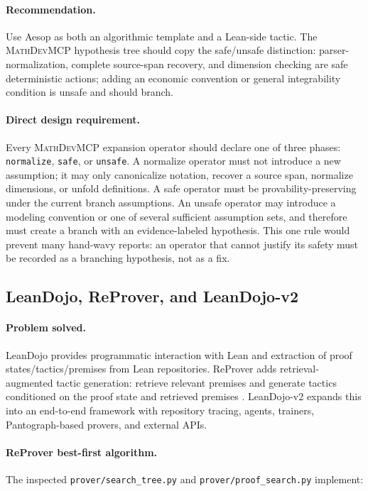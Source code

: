 \documentclass[11pt]{article}
\newcommand{\MathDevMCP}{\textsc{MathDevMCP}}
\begin{document}
\paragraph{Recommendation.}
Use Aesop as both an algorithmic template and a Lean-side tactic. The
\MathDevMCP{} hypothesis tree should copy the safe/unsafe distinction:
parser-normalization, complete source-span recovery, and dimension checking are
safe deterministic actions; adding an economic convention or general
integrability condition is unsafe and should branch.

\paragraph{Direct design requirement.}
Every \MathDevMCP{} expansion operator should declare one of three phases:
\texttt{normalize}, \texttt{safe}, or \texttt{unsafe}. A normalize operator
must not introduce a new assumption; it may only canonicalize notation,
recover a source span, normalize dimensions, or unfold definitions. A safe
operator must be provability-preserving under the current branch assumptions.
An unsafe operator may introduce a modeling convention or one of several
sufficient assumption sets, and therefore must create a branch with an
evidence-labeled hypothesis. This one rule would prevent many hand-wavy
reports: an operator that cannot justify its safety must be recorded as a
branching hypothesis, not as a fix.

\subsection{LeanDojo, ReProver, and LeanDojo-v2}

\paragraph{Problem solved.}
LeanDojo provides programmatic interaction with Lean and extraction of proof
states/tactics/premises from Lean repositories. ReProver adds
retrieval-augmented tactic generation: retrieve relevant premises and generate
tactics conditioned on the proof state and retrieved premises
\cite{yang2023leandojo,reprovergithub}. LeanDojo-v2 expands this into an
end-to-end framework with repository tracing, agents, trainers, Pantograph-based
provers, and external APIs.

\paragraph{ReProver best-first algorithm.}
The inspected \texttt{prover/search\_tree.py} and
\texttt{prover/proof\_search.py} implement:
\end{document}
